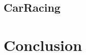 \documentclass[a4paper,12pt]{article}
\begin{document}
\subsection{CarRacing}\label{carracing}



\section{Conclusion}
\end{document}
